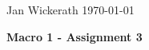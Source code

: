 \documentclass{article}
\begin{document}
\thispagestyle{empty}
\noindent Jan Wickerath  \hfill \today \\
\begin{center}
\Large \textbf{Macro 1 - Assignment 3}
\end{center}
\vspace{1cm}


\end{document}
